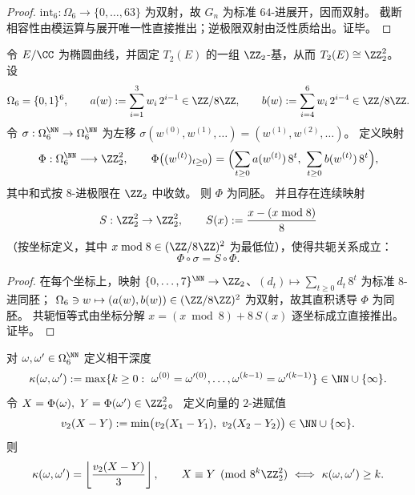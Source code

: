 \begin{proof}
\(\mathrm{int}_6:\Omega_6\to\{0,\dots,63\}\) 为双射，故 \(G_n\) 为标准 \(64\)-进展开，因而双射。
截断相容性由模运算与展开唯一性直接推出；逆极限双射由泛性质给出。证毕。
\end{proof}

\begin{theorem}\label{thm:conclusion-window6-8adic-readout-shift-conjugacy}
令 \(E/\CC\) 为椭圆曲线，并固定 \(T_2(E)\) 的一组 \(\ZZ_2\)-基，从而 \(T_2(E)\cong \ZZ_2^2\)。
设
\[
\Omega_6=\{0,1\}^6,
\qquad
a(w):=\sum_{i=1}^{3}w_i\,2^{i-1}\in \ZZ/8\ZZ,
\qquad
b(w):=\sum_{i=4}^{6}w_i\,2^{i-4}\in \ZZ/8\ZZ.
\]
令 \(\sigma:\Omega_6^{\NN}\to\Omega_6^{\NN}\) 为左移 \(\sigma(w^{(0)},w^{(1)},\dots)=(w^{(1)},w^{(2)},\dots)\)。
定义映射
\[
\Phi:\Omega_6^{\NN}\longrightarrow \ZZ_2^2,\qquad
\Phi\bigl((w^{(t)})_{t\ge 0}\bigr)
=\Bigl(\sum_{t\ge 0}a(w^{(t)})\,8^t,\ \sum_{t\ge 0}b(w^{(t)})\,8^t\Bigr),
\]
其中和式按 \(8\)-进极限在 \(\ZZ_2\) 中收敛。
则 \(\Phi\) 为同胚。
并且存在连续映射
\[
S:\ZZ_2^2\to \ZZ_2^2,\qquad
S(x):=\frac{x-(x\bmod 8)}{8}
\]
（按坐标定义，其中 \(x\bmod 8\in(\ZZ/8\ZZ)^2\) 为最低位），使得共轭关系成立：
\[
\Phi\circ\sigma=S\circ\Phi.
\]
\end{theorem}

\begin{proof}
在每个坐标上，映射 \(\{0,\dots,7\}^{\NN}\to\ZZ_2\)、\((d_t)\mapsto\sum_{t\ge 0}d_t\,8^t\) 为标准 \(8\)-进同胚；
\(\Omega_6\ni w\mapsto(a(w),b(w))\in(\ZZ/8\ZZ)^2\) 为双射，故其直积诱导 \(\Phi\) 为同胚。
共轭恒等式由坐标分解
\(
x=(x\bmod 8)+8\,S(x)
\)
逐坐标成立直接推出。证毕。
\end{proof}

\begin{corollary}\label{cor:conclusion-window6-coherence-depth-v2}
对 \(\omega,\omega'\in\Omega_6^{\NN}\) 定义相干深度
\[
\kappa(\omega,\omega'):=\max\{k\ge 0:\ \omega^{(0)}=\omega'^{(0)},\dots,\omega^{(k-1)}=\omega'^{(k-1)}\}\in\NN\cup\{\infty\}.
\]
令 \(X=\Phi(\omega),\ Y=\Phi(\omega')\in\ZZ_2^2\)。
定义向量的 \(2\)-进赋值
\[
v_2(X-Y):=\min\bigl(v_2(X_1-Y_1),\ v_2(X_2-Y_2)\bigr)\in\NN\cup\{\infty\}.
\]
则
\[
\kappa(\omega,\omega')=\left\lfloor\frac{v_2(X-Y)}{3}\right\rfloor,
\qquad
X\equiv Y\pmod{8^k\ZZ_2^2}\ \Longleftrightarrow\ \kappa(\omega,\omega')\ge k.
\]
\end{corollary}

